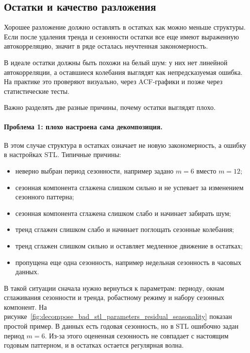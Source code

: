 \documentclass[12pt,fleqn]{article}
\begin{document}
\subsection{Остатки и качество разложения}


Хорошее разложение должно оставлять в остатках как можно меньше структуры.
Если после удаления тренда и сезонности остатки все еще имеют выраженную автокорреляцию, значит в ряде осталась неучтенная закономерность.

В идеале остатки должны быть похожи на белый шум: у них нет линейной автокорреляции, а оставшиеся колебания выглядят как непредсказуемая ошибка.
На практике это проверяют визуально, через ACF-графики и позже через статистические тесты.

Важно разделять две разные причины, почему остатки выглядят плохо.

\paragraph{Проблема 1: плохо настроена сама декомпозиция.}
В этом случае структура в остатках означает не новую закономерность, а ошибку в настройках STL.
Типичные причины:

\begin{itemize}
  \item неверно выбран период сезонности, например задано \(m=6\) вместо \(m=12\);
  \item сезонная компонента сглажена слишком сильно и не успевает за изменением сезонного паттерна;
  \item сезонная компонента сглажена слишком слабо и начинает забирать шум;
  \item тренд сглажен слишком слабо и начинает поглощать сезонные колебания;
  \item тренд сглажен слишком сильно и оставляет медленное движение в остатках;
  \item пропущена еще одна сезонность, например недельная сезонность в часовых данных.
\end{itemize}

В такой ситуации сначала нужно вернуться к параметрам: периоду, окнам сглаживания сезонности и тренда, робастному режиму и набору сезонных компонент.
На рисунке~\ref{fig:decompose_bad_stl_parameters_residual_seasonality} показан простой пример.
В данных есть годовая сезонность, но в STL ошибочно задан период \(m=6\).
Из-за этого оцененная сезонность не совпадает с настоящим годовым паттерном, и в остатках остается регулярная волна.
\end{document}

